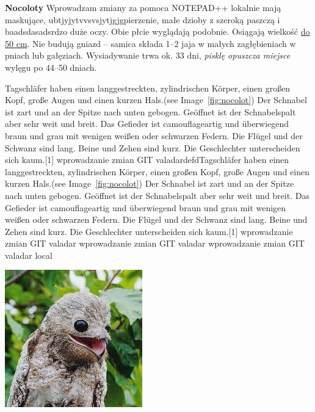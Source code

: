     \begin{flushleft}
         \textbf{Nocoloty} 
		 Wprowadzam zmiany za pomoca NOTEPAD++ lokalnie
		 mają maskujące,  ubtjyjytvvsvsjytjgjgpierzenie, małe dzioby z szeroką paszczą i baadsdasadsrdzo duże oczy. Obie płcie wyglądają podobnie. Osiągają wielkość \underline{do 50 cm}. Nie budują gniazd – samica składa 1–2 jaja w małych zagłębieniach w pniach lub gałęziach. Wysiadywanie trwa ok. 33 dni, \textit{pisklę opuszcza miejsce} wylęgu po 44–50 dniach. \par Tagschläfer haben einen langgestreckten, zylindrischen Körper, einen großen Kopf, große Augen und einen kurzen Hals.(see Image~\ref{fig:nocolot}) Der Schnabel ist zart und an der Spitze nach unten gebogen. Geöffnet ist der Schnabelspalt aber sehr weit und breit. Das Gefieder ist camouflageartig und überwiegend braun und grau mit wenigen weißen oder schwarzen Federn. Die Flügel und der Schwanz sind lang. Beine und Zehen sind kurz. Die Geschlechter unterscheiden sich kaum.[1]
        wprowadzanie zmian GIT valadardefdTagschläfer haben einen langgestreckten, zylindrischen Körper, einen großen Kopf, große Augen und einen kurzen Hals.(see Image~\ref{fig:nocolot}) Der Schnabel ist zart und an der Spitze nach unten gebogen. Geöffnet ist der Schnabelspalt aber sehr weit und breit. Das Gefieder ist camouflageartig und überwiegend braun und grau mit wenigen weißen oder schwarzen Federn. Die Flügel und der Schwanz sind lang. Beine und Zehen sind kurz. Die Geschlechter unterscheiden sich kaum.[1]
        wprowadzanie zmian GIT valadar
wprowadzanie zmian GIT valadar
wprowadzanie zmian GIT valadar local

             \centering
             \includegraphics{pictures/nocolot.jpg}
             \label{fig:nocolot}
         
\end{flushleft}





